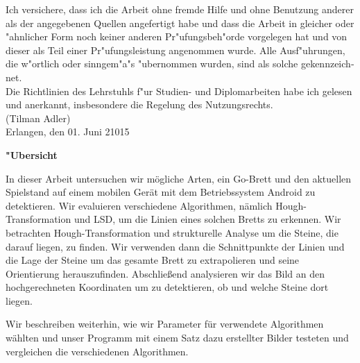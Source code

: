 \documentclass[english,bt]{package/lmedoc}
\begin{document}
\begin{otherlanguage}{ngerman}
Ich versichere, dass ich die Arbeit ohne fremde Hilfe und ohne Benutzung
anderer als der angegebenen Quellen angefertigt habe und dass die Arbeit
in glei\-cher oder "ahnlicher Form noch keiner anderen Pr"ufungsbeh"orde
vorgelegen hat und von dieser als Teil einer Pr"ufungsleistung
angenommen wurde. Alle Ausf"uhrungen, die w"ortlich oder sinngem"a"s
"ubernommen wurden, sind als solche gekennzeichnet.
\\

Die Richtlinien des Lehrstuhls f"ur Studien- und Diplomarbeiten
habe ich gelesen und anerkannt, insbesondere die Regelung des
Nutzungsrechts. \\[15mm]

\noindent (Tilman Adler)\\[15mm]
Erlangen, den 01. Juni 21015 \hspace{6.0cm} \\[10mm]
\end{otherlanguage}

\cleardoublepage

\begin{center}
\bfseries
"Ubersicht
\normalfont

In dieser Arbeit untersuchen wir mögliche Arten, ein Go-Brett und den aktuellen Spielstand auf einem mobilen Gerät mit dem Betriebssystem Android zu detektieren. Wir evaluieren verschiedene Algorithmen, nämlich Hough-Transformation und LSD, um die Linien eines solchen Bretts zu erkennen. Wir betrachten Hough-Transformation und strukturelle Analyse um die Steine, die darauf liegen, zu finden. Wir verwenden dann die Schnittpunkte der Linien und die Lage der Steine um das gesamte Brett zu extrapolieren und seine Orientierung herauszufinden. Abschließend analysieren wir das Bild an den hochgerechneten Koordinaten um zu detektieren, ob und welche Steine dort liegen.

Wir beschreiben weiterhin, wie wir Parameter für verwendete Algorithmen wählten und unser Programm mit einem Satz dazu erstellter Bilder testeten und vergleichen die verschiedenen Algorithmen.
\end{center}


\vspace{5.0cm}
\end{document}
